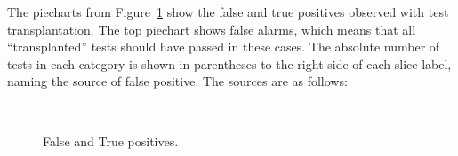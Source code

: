 \documentclass[10pt,conference,anonymous]{IEEEtran}
\begin{document}
The piecharts from Figure~\ref{fig:piecharts-transplantation} show the
false and true positives observed with test transplantation. The top
piechart shows false alarms, which means that all
``transplanted'' tests should have passed in these cases. The absolute
number of tests in each category is shown in parentheses to the
right-side of each slice label, naming the source of false
positive. The sources are as follows:

\begin{figure}[h]
  \centering
  \label{1a}\hfill
  \label{1b}\\
  \caption{\label{fig:piecharts-transplantation}False and True positives.}
\end{figure}
\end{document}
